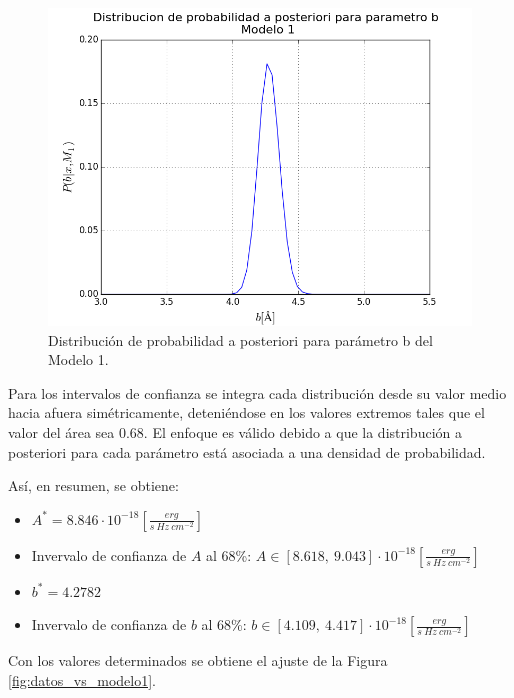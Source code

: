 \documentclass{article}
\begin{document}
\begin{figure}[ht]
  \centering
  \includegraphics[scale = 0.5]{images/distr_b_modelo1.png}
  \caption{Distribución de probabilidad a posteriori para parámetro b del Modelo 1.}
  \label{fig:distr_b_modelo1}
\end{figure}

Para los intervalos de confianza se integra cada distribución desde su valor medio hacia afuera simétricamente, deteniéndose en los valores extremos tales que el valor del área sea 0.68. El enfoque es válido debido a que la distribución a posteriori para cada parámetro está asociada a una densidad de probabilidad.

Así, en resumen, se obtiene:

\begin{itemize}
  \item $A^* = 8.846 \cdot 10^{-18} [\frac{erg}{s\ Hz\ cm^{-2}}]$

  \item Invervalo de confianza de $A$ al 68\%: $A \in [8.618,\  9.043] \cdot 10^{-18} [\frac{erg}{s\ Hz\ cm^{-2}}]$

  \item $b^* = 4.2782$
  
  \item Invervalo de confianza de $b$ al 68\%: $b \in [4.109,\  4.417] \cdot 10^{-18} [\frac{erg}{s\ Hz\ cm^{-2}}]$
  
\end{itemize}

Con los valores determinados se obtiene el ajuste de la Figura \ref{fig:datos_vs_modelo1}.
\end{document}
